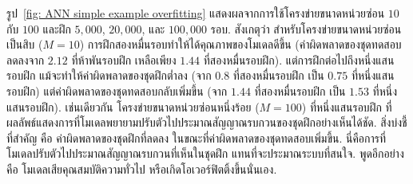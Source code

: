 รูป~\ref{fig: ANN simple example overfitting} แสดงผลจากการใช้โครงข่ายขนาดหน่วยซ่อน $10$ กับ $100$ และฝึก $5,000$, $20,000$, และ $100,000$ รอบ.
สังเกตุว่า สำหรับโครงข่ายขนาดหน่วยซ่อนเป็นสิบ ($M=10$) 
การฝึกสองหมื่นรอบทำให้ได้คุณภาพของโมเดลดีขึ้น (ค่าผิดพลาดของชุดทดสอบลดลงจาก $2.12$ ที่ห้าพันรอบฝึก เหลือเพียง $1.44$ ที่สองหมื่นรอบฝึก).
แต่การฝึกต่อไปถึงหนึ่งแสนรอบฝึก แม้จะทำให้ค่าผิดพลาดของชุดฝึกต่ำลง (จาก $0.8$ ที่สองหมื่นรอบฝึก เป็น $0.75$ ที่หนึ่งแสนรอบฝึก) แต่ค่าผิดพลาดของชุดทดสอบกลับเพิ่มขึ้น (จาก $1.44$ ที่สองหมื่นรอบฝึก เป็น $1.53$ ที่หนึ่งแสนรอบฝึก).
เช่นเดียวกัน โครงข่ายขนาดหน่วยซ่อนหนึ่งร้อย ($M=100$) ที่หนึ่งแสนรอบฝึก ที่ผลลัพธ์แสดงการที่โมเดลพยายามปรับตัวไปประมาณสัญญาณรบกวนของชุดฝึกอย่างเห็นได้ชัด.
สิ่งบ่งชี้ที่สำคัญ คือ ค่าผิดพลาดของชุดฝึกที่ลดลง ในขณะที่ค่าผิดพลาดของชุดทดสอบเพิ่มขึ้น.
นี่คือการที่โมเดลปรับตัวไปประมาณสัญญาณรบกวนที่เห็นในชุดฝึก แทนที่จะประมาณระบบที่สนใจ.
พูดอีกอย่างคือ โมเดลเสียคุณสมบัติความทั่วไป หรือเกิดโอเวอร์ฟิตติ้งขึ้นนั่นเอง.


